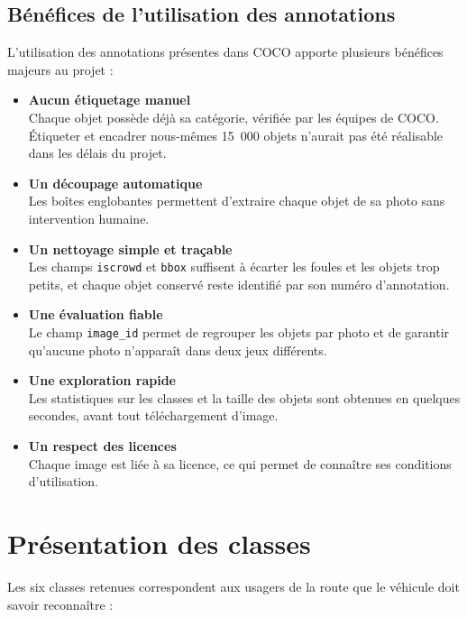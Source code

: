\subsection{Bénéfices de l'utilisation des annotations}

L'utilisation des annotations présentes dans COCO apporte plusieurs bénéfices majeurs au projet :

\begin{itemize}
  \item \textbf{Aucun étiquetage manuel}\\
  Chaque objet possède déjà sa catégorie, vérifiée par les équipes de COCO. Étiqueter et encadrer nous-mêmes 15~000 objets n'aurait pas été réalisable dans les délais du projet.
  \item \textbf{Un découpage automatique}\\
  Les boîtes englobantes permettent d'extraire chaque objet de sa photo sans intervention humaine.
  \item \textbf{Un nettoyage simple et traçable}\\
  Les champs \texttt{iscrowd} et \texttt{bbox} suffisent à écarter les foules et les objets trop petits, et chaque objet conservé reste identifié par son numéro d'annotation.
  \item \textbf{Une évaluation fiable}\\
  Le champ \texttt{image\_id} permet de regrouper les objets par photo et de garantir qu'aucune photo n'apparaît dans deux jeux différents.
  \item \textbf{Une exploration rapide}\\
  Les statistiques sur les classes et la taille des objets sont obtenues en quelques secondes, avant tout téléchargement d'image.
  \item \textbf{Un respect des licences}\\
  Chaque image est liée à sa licence, ce qui permet de connaître ses conditions d'utilisation.
\end{itemize}

\section{Présentation des classes}

Les six classes retenues correspondent aux usagers de la route que le véhicule doit savoir reconnaître :

